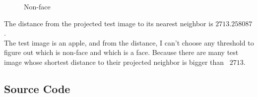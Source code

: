 \documentclass[letterpaper]{polythesis}
\begin{document}
\begin{figure}[htbp]
  \centering
  \caption{Non-face}
  \label{fig:result 0.1} %
\end{figure}

The distance from the projected test image to its nearest neighbor
is $2713.258087$.\\

The test image is an apple, and from the distance, I can't choose any threshold
to figure out which is non-face and which is a face. Because there are many
test image whose shortest distance to their projected neighbor is bigger than \
$2713$.

\newpage


\begin{appendices}
\renewcommand{\thechapter}{\Alph{chapter}.}
  \chapter{Source Code}
\end{appendices}


\clearpage

\backmatter
\end{document}
